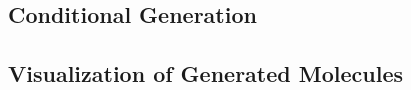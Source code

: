 \subsection{Conditional Generation}
\label{appsubsec:conditional_generation}




\clearpage
\subsection{Visualization of Generated Molecules}
\label{appsubsec:visualization_of_generated_molecules}







\clearpage





\clearpage

